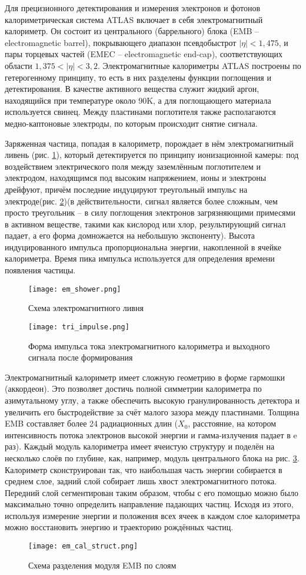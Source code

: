 Для прецизионного детектирования и измерения электронов и фотонов калориметрическая система ATLAS включает в себя электромагнитный калориметр. Он состоит из центрального (баррельного) блока (EMB -- electromagnetic barrel), покрывающего диапазон псевдобыстрот $|\eta| < 1,475$, и пары торцевых частей (EMEC -- electromagnetic end-cap), соответствующих области $1,375 < |\eta| < 3,2$. Электромагнитные калориметры ATLAS построены по гетерогенному принципу, то есть в них разделены функции поглощения и детектирования. В качестве активного вещества служит жидкий аргон, находящийся при температуре около 90K, а для поглощающего материала используется свинец. Между пластинами поглотителя также располагаются медно-каптоновые электроды, по которым происходит снятие сигнала.\par
Заряженная частица, попадая в калориметр, порождает в нём электромагнитный ливень (рис. \ref{fig:em_shower})\parencite{em_shower_wiki}, который детектируется по принципу ионизационной камеры: под воздействием электрического поля между заземлённым поглотителем и электродом, находящимся под высоким напряжением, ионы и электроны дрейфуют, причём последние индуцируют треугольный импульс на электроде(рис. \ref{fig:tri_impulse})(в действительности, сигнал является более сложным, чем просто треугольник -- в силу поглощения электронов загрязняющими примесями в активном веществе, такими как кислород или хлор, результирующий сигнал падает, а его форма домножается на небольшую экспоненту). Высота индуцированного импульса пропорциональна энергии, накопленной в ячейке калориметра. Время пика импульса используется для определения времени появления частицы.\par
\begin{figure}[ht]
    \centering
    \texttt{[image: em\_shower.png]}
    \caption{Схема электромагнитного ливня}
    \label{fig:em_shower}
\end{figure}
\begin{figure}[ht]
    \centering
    \texttt{[image: tri\_impulse.png]}
    \caption{Форма импульса тока электромагнитного калориметра и выходного сигнала после формирования}
    \label{fig:tri_impulse}
\end{figure}
Электромагнитный калориметр имеет сложную геометрию в форме гармошки (аккордеон). Это позволяет достичь полной симметрии калориметра по азимутальному углу, а также обеспечить высокую гранулированность детектора и увеличить его быстродействие за счёт малого зазора между пластинами. Толщина EMB составляет более 24 радиационных длин ($X_0$, расстояние, на котором интенсивность потока электронов высокой энергии и гамма-излучения падает в e раз). Каждый модуль калориметра имеет ячеистую структуру и поделён на несколько слоёв по глубине, как, например, модуль центрального блока на рис. \ref{fig:em_cal_struct}. Калориметр сконструирован так, что наибольшая часть энергии собирается в среднем слое, задний слой собирает лишь хвост электромагнитного потока. Передний слой сегментирован таким образом, чтобы с его помощью можно было максимально точно определить направление падающих частиц. Исходя из этого, используя измерение энергии и положения всех ячеек в каждом слое калориметра можно восстановить энергию и траекторию рождённых частиц.
\begin{figure}[ht]
    \centering
    \texttt{[image: em\_cal\_struct.png]}
    \caption{Схема разделения модуля EMB по слоям}
    \label{fig:em_cal_struct}
\end{figure}
